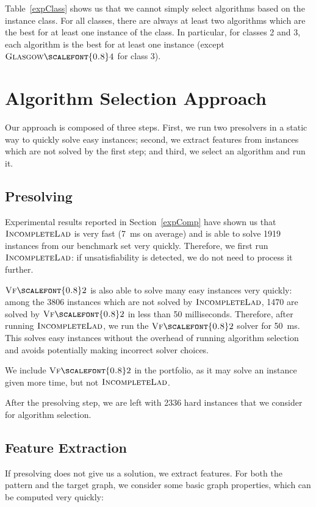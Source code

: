 \documentclass{llncs}
\newcommand{\VFtwo}{$\textsc{Vf{\scalefont{0.8}2}}$\xspace}
\newcommand{\IncompleteLAD}{$\textsc{IncompleteLad}$\xspace}
\newcommand{\GlasgowFour}{$\textsc{Glasgow{\scalefont{0.8}4}}$\xspace}
\begin{document}
Table~\ref{expClass} shows us that we cannot simply select algorithms based on
the instance class. For all
classes, there are always at least two algorithms which are the best for at least one instance of
the class. In particular, for classes 2 and 3, each algorithm is the best for at least one instance
(except \GlasgowFour for class 3).

\section{Algorithm Selection Approach}\label{sec:algsel}

Our approach is composed of three steps. First, we run two presolvers in a static way to quickly
solve easy instances; second, we extract features from instances which are not solved by the first
step; and third, we select an algorithm and run it.

\subsection{Presolving}

Experimental results reported in Section~\ref{expComp} have shown us that \IncompleteLAD is very fast
(\SI{7}{\ms} on average) and is able to solve 1919 instances from our benchmark
set very quickly. Therefore, we first run
\IncompleteLAD: if unsatisfiability is detected, we do not need to process it further.

\VFtwo is also able to solve many easy instances very quickly: among the 3806 instances which are not
solved by \IncompleteLAD, 1470 are solved by \VFtwo in less than 50 milliseconds. Therefore, after
running \IncompleteLAD, we run the \VFtwo solver for \SI{50}{\ms}. This solves easy instances without
the overhead of running algorithm selection and avoids potentially making incorrect solver choices.

We include \VFtwo in the portfolio, as it may solve an instance given more time,
but not \IncompleteLAD.

After the presolving step, we are left with 2336 hard instances that we consider
for algorithm selection.

\subsection{Feature Extraction}

If presolving does not give us a solution, we extract features. For both the pattern and
the target graph, we consider some basic graph properties, which can be computed
very quickly:
\end{document}
